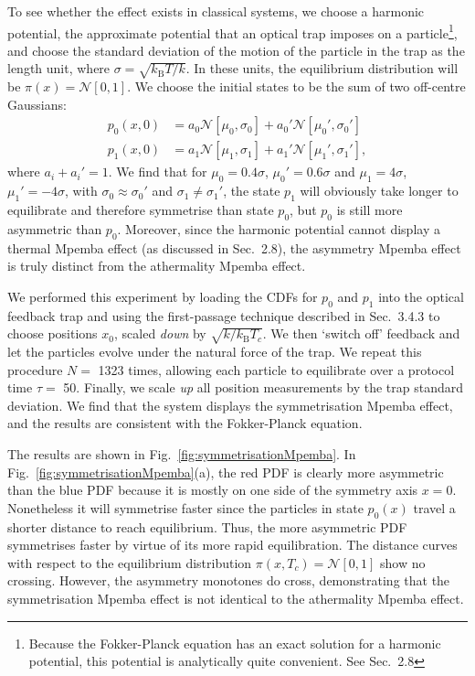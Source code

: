 \documentclass[hyperref={colorlinks=true, urlcolor=blue, citecolor=blue, final, bound}]{sfuthesis}
\newcommand{\kB}{k_{\mathrm{B}}}
\begin{document}
\begin{appendices}
To see whether the effect exists in classical systems, we choose a harmonic potential, the approximate potential that an optical trap imposes on a particle\footnote{Because the Fokker-Planck equation has an exact solution for a harmonic potential, this potential is analytically quite convenient. See Sec.~2.8}, and choose the standard deviation of the motion of the particle in the trap as the length unit, where $\sigma = \sqrt{\kB T/k}$. In these units, the equilibrium distribution will be $\pi(x)=\mathcal N[0,1]$. We choose the initial states to be the sum of two off-centre Gaussians:
\begin{align}
    p_0(x,0) &= a_0\mathcal N[\mu_0,\sigma_0] + a_0'\mathcal N[\mu_0',\sigma_0']\\
    p_1(x,0) &= a_1\mathcal N[\mu_1,\sigma_1] + a_1'\mathcal N[\mu_1',\sigma_1'],
\end{align}
where $a_i+a_i'=1$. We find that for $\mu_0=0.4\sigma$, $\mu_0'=0.6\sigma$ and $\mu_1=4\sigma$, $\mu_1'=-4\sigma$, with $\sigma_0\approx\sigma_0'$ and $\sigma_1\neq \sigma_1'$, the state $p_1$ will obviously take longer to equilibrate and therefore symmetrise than state $p_0$, but $p_0$ is still more asymmetric than $p_0$. Moreover, since the harmonic potential cannot display a thermal Mpemba effect (as discussed in Sec.~2.8), the asymmetry Mpemba effect is truly distinct from the athermality Mpemba effect.

We performed this experiment by loading the CDFs for $p_0$ and $p_1$ into the optical feedback trap and using the first-passage technique described in Sec.~3.4.3 to choose positions $x_0$, scaled \textit{down} by $\sqrt{k/\kB T_c}$. We then `switch off' feedback and let the particles evolve under the natural force of the trap. We repeat this procedure $N=$ \num{1323} times, allowing each particle to equilibrate over a protocol time $\tau=$ \qty{50}{\milli{\second}}. Finally, we scale \textit{up} all position measurements by the trap standard deviation. We find that the system displays the symmetrisation Mpemba effect, and the results are consistent with the Fokker-Planck equation.

The results are shown in Fig.~\ref{fig:symmetrisationMpemba}. In Fig.~\ref{fig:symmetrisationMpemba}(a), the red PDF is clearly more asymmetric than the blue PDF because it is mostly on one side of the symmetry axis $x=0$. Nonetheless it will symmetrise faster since the particles in state $p_0(x)$ travel a shorter distance to reach equilibrium. Thus, the more asymmetric PDF symmetrises faster by virtue of its more rapid equilibration. The distance curves with respect to the equilibrium distribution $\pi(x,T_c)=\mathcal N[0,1]$ show no crossing. However, the asymmetry monotones do cross, demonstrating that the symmetrisation Mpemba effect is not identical to the athermality Mpemba effect. 
\end{appendices}
\printbibliography
\end{document}
